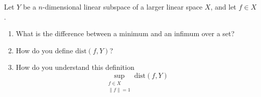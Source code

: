 \documentclass[article,12pt,a4paper]{article}
\begin{document}
	Let $Y$ be a $n$-dimensional linear subspace of a larger linear space $X$, and let $f\in X$.
	\begin{enumerate}
		\item What is the difference between a minimum and an infimum over a set?
		\item  How do you define $\text{dist}(f, Y)$?
		\item  How do you understand this definition 
		$$
		\sup_{\substack{f \in X \\ \|f\| = 1}} \text{dist}(f, Y)
		$$
	\end{enumerate}
	
	
\end{document}
